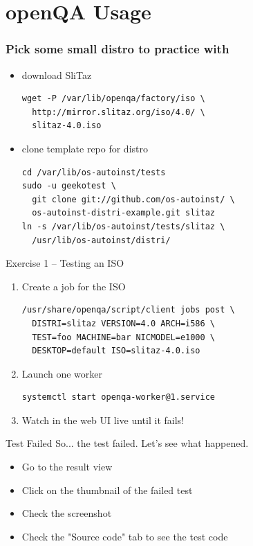 \documentclass{beamer}
\begin{document}
\section{openQA Usage}
%
%
\begin{frame}[fragile]
  \frametitle{Pick some small distro to practice with}
  \begin{itemize}
  \item download SliTaz
    \lstset{style=mybash}
    \begin{lstlisting}
wget -P /var/lib/openqa/factory/iso \
  http://mirror.slitaz.org/iso/4.0/ \
  slitaz-4.0.iso
    \end{lstlisting}
  \item clone template repo for distro
    \lstset{style=mybash}
    \begin{lstlisting}
cd /var/lib/os-autoinst/tests
sudo -u geekotest \
  git clone git://github.com/os-autoinst/ \
  os-autoinst-distri-example.git slitaz
ln -s /var/lib/os-autoinst/tests/slitaz \
  /usr/lib/os-autoinst/distri/
    \end{lstlisting}
  \end{itemize}
\end{frame}

%
%
\begin{frame}[fragile]{Exercise 1 -- Testing an ISO}
  \begin{enumerate}
  \item Create a job for the ISO
    \lstset{style=mybash}
    \begin{lstlisting}
/usr/share/openqa/script/client jobs post \
  DISTRI=slitaz VERSION=4.0 ARCH=i586 \
  TEST=foo MACHINE=bar NICMODEL=e1000 \
  DESKTOP=default ISO=slitaz-4.0.iso
    \end{lstlisting}
  \item Launch one worker
    \lstset{style=mybash}
    \begin{lstlisting}
systemctl start openqa-worker@1.service
    \end{lstlisting}
  \item Watch in the web UI live until it fails!
  \end{enumerate}
\end{frame}

%
%
\begin{frame}{Test Failed}
  So... the test failed. Let's see what happened.
  \begin{itemize}
  \item Go to the result view
  \item Click on the thumbnail of the failed test
  \item Check the screenshot
  \item Check the "Source code" tab to see the test code
  \end{itemize}
\end{frame}
\end{document}
